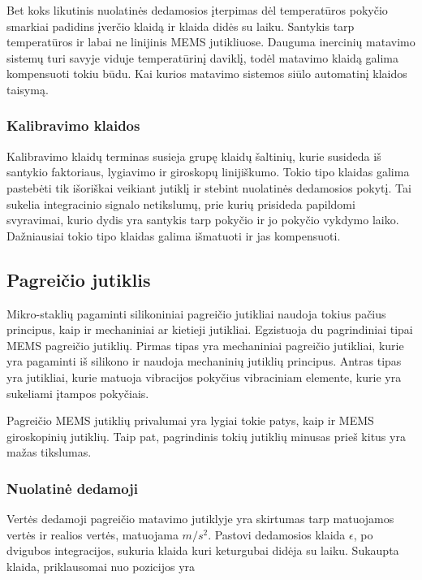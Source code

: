 Bet koks likutinis nuolatinės dedamosios įterpimas dėl temperatūros pokyčio smarkiai padidins įverčio klaidą ir klaida didės su laiku. Santykis tarp temperatūros ir labai ne linijinis MEMS jutikliuose. Dauguma inercinių matavimo sistemų turi savyje viduje temperatūrinį daviklį, todėl matavimo klaidą galima kompensuoti tokiu būdu. Kai kurios matavimo sistemos siūlo automatinį klaidos taisymą.

\subsubsection{Kalibravimo klaidos}

Kalibravimo klaidų terminas susieja grupę klaidų šaltinių, kurie susideda iš santykio faktoriaus, lygiavimo ir giroskopų linijiškumo. Tokio tipo klaidas galima pastebėti tik išoriškai veikiant jutiklį ir stebint nuolatinės dedamosios pokytį. Tai sukelia integracinio signalo netikslumų, prie kurių prisideda papildomi svyravimai, kurio dydis yra santykis tarp pokyčio ir jo pokyčio vykdymo laiko. Dažniausiai tokio tipo klaidas galima išmatuoti ir jas kompensuoti.


\subsection{Pagreičio jutiklis}

Mikro-staklių pagaminti silikoniniai pagreičio jutikliai naudoja tokius pačius principus, kaip ir mechaniniai ar kietieji jutikliai. Egzistuoja du pagrindiniai tipai MEMS pagreičio jutiklių. Pirmas tipas yra mechaniniai pagreičio jutikliai, kurie yra pagaminti iš silikono ir naudoja mechaninių jutiklių principus. Antras tipas yra jutikliai, kurie matuoja vibracijos pokyčius vibraciniam elemente, kurie yra sukeliami įtampos pokyčiais.

Pagreičio MEMS jutiklių privalumai yra lygiai tokie patys, kaip ir MEMS giroskopinių jutiklių. Taip pat, pagrindinis tokių jutiklių minusas prieš kitus yra mažas tikslumas. 

\subsubsection{Nuolatinė dedamoji}

Vertės dedamoji pagreičio matavimo jutiklyje yra skirtumas tarp matuojamos vertės ir realios vertės, matuojama $m/s^2$. Pastovi dedamosios klaida $\epsilon$, po dvigubos integracijos, sukuria klaida kuri keturgubai didėja su laiku. Sukaupta klaida, priklausomai nuo pozicijos yra

